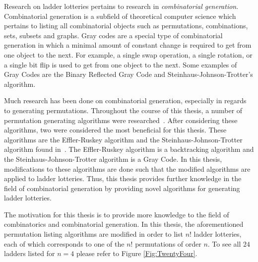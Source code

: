 Research on ladder lotteries pertains to research in \emph{combinatorial generation}. Combinatorial 
generation is a subfield of theoretical computer science which pertains to listing 
all combinatorial objects such as permutations, combinations, sets, subsets and graphs. Gray codes are a 
special type of combinatorial generation in which a minimal amount of constant change 
is required to get from one object to the next. For example, a single swap operation,
a single rotation, or a single bit flip is used to get from one object to the next. Some examples of Gray Codes 
are the Binary Reflected Gray Code and Steinhaus-Johnson-Trotter's algorithm.\par 
Much research has been done on combinatorial generation, especially 
in regards to generating permutations. Throughout the course of this thesis,
a number of permutation generating algorithms were researched~\cite{A18}\cite{A19}\cite{A21}\cite{A24}\cite{A25}\cite{A26}\cite{A31}\cite{A34}\cite{A35}\cite{A36}\cite{A37}.
After considering these algorithms, two were considered the most beneficial for this thesis. 
These algorithms are the Effler-Ruskey algorithm and the Steinhaus-Johnson-Trotter algorithm found in~\cite{A26}\cite{A25}. 
The Effler-Ruskey algorithm is a backtracking algorithm and the Steinhaus-Johnson-Trotter algorithm
is a Gray Code. In this thesis, modifications to these algorithms are done such that the 
modified algorithms are applied to ladder lotteries. Thus, this thesis provides further knowledge 
in the field of combinatorial generation by providing novel algorithms for generating ladder lotteries.\par 
The motivation for this thesis is to provide more knowledge to the field of combinatorics and combinatorial 
generation. In this thesis, the aforementioned permutation listing algorithms are modified in order to 
list $n!$ ladder lotteries, each of which corresponds to one of the $n!$ permutations of order $n$.
To see all $24$ ladders listed for $n=4$ please refer to Figure \ref{Fig:TwentyFour}. 
